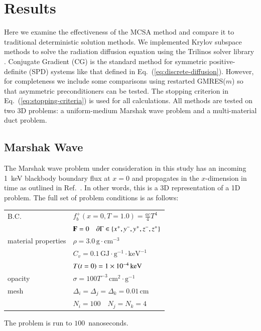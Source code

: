 \documentclass[preprint,12pt]{elsarticle}
\newcommand{\Cv}{\ensuremath{C_{v}}}
\newcommand{\Di}{\ensuremath{\Delta_i}}
\newcommand{\Dj}{\ensuremath{\Delta_j}}
\newcommand{\Dk}{\ensuremath{\Delta_k}}
\begin{document}
\section{Results}
\label{sec:results}

Here we examine the effectiveness of the MCSA method and compare it to
traditional deterministic solution methods.  We implemented Krylov subspace
methods to solve the radiation diffusion equation using the Trilinos solver
library \cite{1089021}.  Conjugate Gradient (CG) is the standard method for
symmetric positive-definite (SPD) systems like that defined in
Eq.~(\ref{eq:discrete-diffusion}).  However, for completeness we include some
comparisons using restarted GMRES($m$) so that asymmetric preconditioners can
be tested. The stopping criterion in Eq.~(\ref{eq:stopping-criteria}) is used
for all calculations. All methods are tested on two 3D problems: a
uniform-medium Marshak wave problem and a multi-material duct problem.

\subsection{Marshak Wave}

The Marshak wave problem under consideration in this study has an incoming
1~keV blackbody boundary flux at $x=0$ and propagates in the $x$-dimension in
time as outlined in Ref.~\cite{larsen_1980}.  In other words, this is a 3D
representation of a 1D problem.  The full set of problem conditions is as
follows:
\begin{center}
  \begin{tabular}{ll}\hline
    B.C. & $f_b^{+}(x=0,T=1.0) = \frac{ac}{4}T^4$ \\ & $\mathbf{F} =
    0\quad \partial\Gamma \in \{x^{+}, y^{-}, y^{+}, z^{-}, z^{+}\}$
    \\ material properties & $\rho =
    3.0\,\text{g}\cdot\text{cm}^{-3}$ \\ & $\Cv =
    0.1\,\text{GJ}\cdot\text{g}^{-1}\cdot\text{keV}^{-1}$\\ &
    $T(t=0) = 1\times 10^{-4}\,\text{keV}$\\  opacity & $\sigma =
    100T^{-3}\,\text{cm}^2\cdot\text{g}^{-1}$ \\  mesh & $\Di = \Dj
    = \Dk = 0.01\,\text{cm}$ \\ & $N_i = 100\quad N_j = N_k = 4$
    \\ \hline
  \end{tabular}
\end{center}
The problem is run to $100$~nanoseconds.
\end{document}
